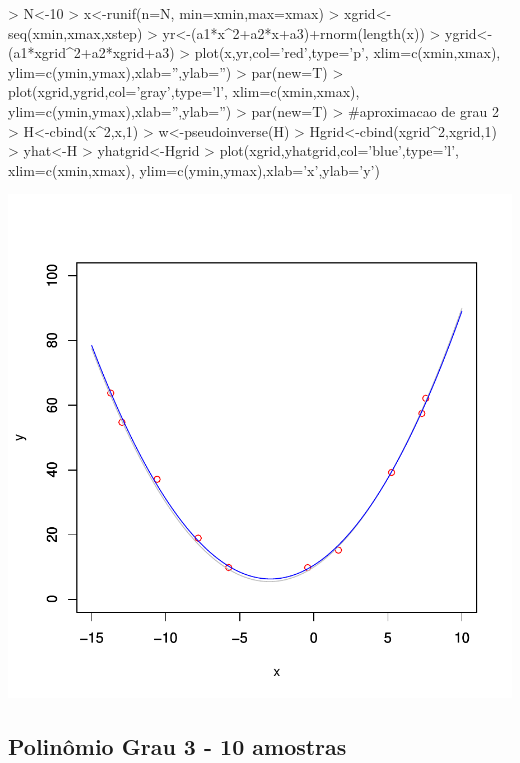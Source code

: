 \documentclass{article}
\begin{document}
\begin{Schunk}
\begin{Sinput}
>   N<-10
>   x<-runif(n=N, min=xmin,max=xmax)
>   xgrid<-seq(xmin,xmax,xstep)
>   yr<-(a1*x^2+a2*x+a3)+rnorm(length(x))
>   ygrid<-(a1*xgrid^2+a2*xgrid+a3)
>   plot(x,yr,col='red',type='p', xlim=c(xmin,xmax), ylim=c(ymin,ymax),xlab='',ylab='')
>   par(new=T)
>   plot(xgrid,ygrid,col='gray',type='l', xlim=c(xmin,xmax), ylim=c(ymin,ymax),xlab='',ylab='')
>   par(new=T)
>   #aproximacao de grau 2
>   H<-cbind(x^2,x,1)
>   w<-pseudoinverse(H) %
>   Hgrid<-cbind(xgrid^2,xgrid,1)
>   yhat<-H%
>   yhatgrid<-Hgrid%
>   plot(xgrid,yhatgrid,col='blue',type='l', xlim=c(xmin,xmax), ylim=c(ymin,ymax),xlab='x',ylab='y')
\end{Sinput}
\end{Schunk}
\includegraphics{aproximacao_polinomial-003}

\newpage
\subsection{Polinômio Grau 3 - 10 amostras}
\end{document}
